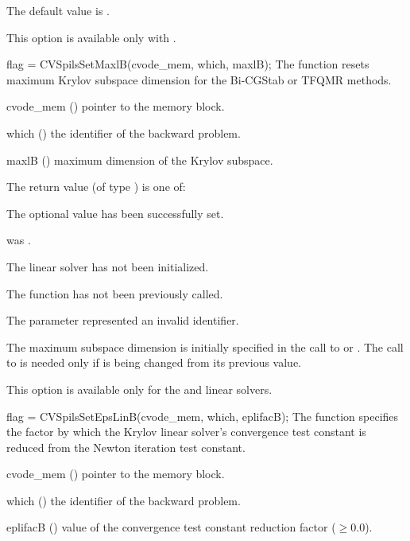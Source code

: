 {
  The default value is .

  {\warn}This option is available only with {\cvspgmr}.
}
{
  flag = CVSpilsSetMaxlB(cvode\_mem, which, maxlB);
}
{
  The function  resets maximum Krylov subspace
  dimension for the Bi-CGStab or TFQMR 
  methods.
}
{
  \begin{args}
  \item[cvode\_mem] ()
    pointer to the {\cvodes} memory block.
  \item[which] ()
    the identifier of the backward problem.
  \item[maxlB] ()
    maximum dimension of the Krylov subspace.
  \end{args}
}
{
  The return value  (of type ) is one of:
  \begin{args}
  \item[\Id{CVSPILS\_SUCCESS}] 
    The optional value has been successfully set.
  \item[\Id{CVSPILS\_MEM\_NULL}]
     was .
  \item[\Id{CVSPILS\_LMEM\_NULL}]
    The {\cvspils} linear solver has not been initialized.
  \item[\Id{CVSPILS\_NO\_ADJ}]
    The function  has not been previously called.
  \item[\Id{CVSPILS\_ILL\_INPUT}]
    The parameter  represented an invalid identifier.
  \end{args}
}
{
  The maximum subspace dimension is initially specified in the call
  to  or .
  The call to  is needed only if  is being changed
  from its previous value.

  {\warn}This option is available only for the {\cvspbcg} and {\cvsptfqmr} linear solvers.

}
{
  flag = CVSpilsSetEpsLinB(cvode\_mem, which, eplifacB);
}
{
  The function  specifies the factor by
  which the Krylov linear solver's convergence test constant is reduced
  from the Newton iteration test constant.
}
{
  \begin{args}
  \item[cvode\_mem] ()
    pointer to the {\cvodes} memory block.
  \item[which] ()
    the identifier of the backward problem.
  \item[eplifacB] ()
    value of the convergence test constant reduction factor ($\geq 0.0$).
  \end{args}
}
